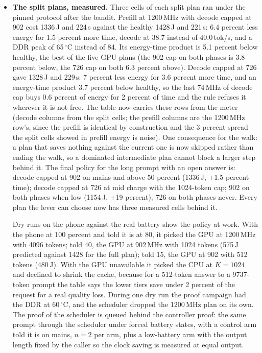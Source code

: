 \documentclass[11pt]{article}
\begin{document}
\begin{itemize}
\item \textbf{The split plans, measured.} Three cells of each split plan ran under the pinned
protocol after the bandit. Prefill at 1200\,MHz with decode capped at 902 cost 1336\,J and
224\,s against the healthy 1428\,J and 221\,s: 6.4 percent less energy for 1.5 percent more
time, decode at 38.7 instead of 40.0\,tok/s, and a DDR peak of 65\,$^\circ$C instead of 84.
Its energy-time product is 5.1 percent below healthy, the best of the five GPU plans (the
902 cap on both phases is 3.8 percent below, the 726 cap on both 6.3 percent above). Decode
capped at 726 gave 1328\,J and 229\,s: 7 percent less energy for 3.6 percent more time, and
an energy-time product 3.7 percent below healthy, so the last 74\,MHz of decode cap buys
0.6 percent of energy for 2 percent of time and the rule refuses it wherever it is not free.
The table now carries these rows from the meter (decode columns from the split cells; the
prefill columns are the 1200\,MHz row's, since the prefill is identical by construction and
the 3 percent spread the split cells showed in prefill energy is noise). One consequence for
the walk: a plan that saves nothing against the current one is now skipped rather than ending
the walk, so a dominated intermediate plan cannot block a larger step behind it. The final
policy for the long prompt with an open answer is: decode capped at 902 on mains and above 50
percent (1336\,J, +1.5 percent time); decode capped at 726 at mid charge with the 1024-token
cap; 902 on both phases when low (1154\,J, +19 percent); 726 on both phases never. Every
plan the lever can choose now has three measured cells behind it.

Dry runs on the phone against the real battery show the policy at work. With the phone at
100 percent and told it is at 80, it picked the GPU at 1200\,MHz with 4096 tokens; told 40,
the GPU at 902\,MHz with 1024 tokens (575\,J predicted against 1428 for the full plan); told
15, the GPU at 902 with 512 tokens (480\,J). With the GPU unavailable it picked the CPU at
$K{=}1024$ and declined to shrink the cache, because for a 512-token answer to a 9737-token
prompt the table says the lower tiers save under 2 percent of the request for a real quality
loss. During one dry run the proof campaign had the DDR at 60\,$^\circ$C, and the scheduler
dropped the 1200\,MHz plan on its own. The proof of the scheduler is queued behind the
controller proof: the same prompt through the scheduler under forced battery states, with
a control arm told it is on mains, $n{=}2$ per arm, plus a low-battery arm with the output
length fixed by the caller so the clock saving is measured at equal output.


\end{itemize}
\end{document}
